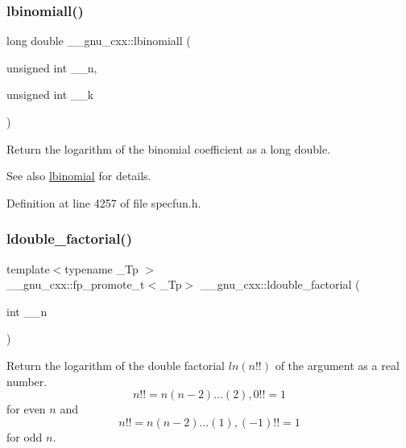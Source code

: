 \subsubsection{\texorpdfstring{lbinomiall()}{lbinomiall()}}
{\footnotesize\ttfamily long double \+\_\+\+\_\+gnu\+\_\+cxx\+::lbinomiall (\begin{DoxyParamCaption}\item[{unsigned int}]{\+\_\+\+\_\+n,  }\item[{unsigned int}]{\+\_\+\+\_\+k }\end{DoxyParamCaption})\hspace{0.3cm}{\ttfamily [inline]}}

Return the logarithm of the binomial coefficient as a {\ttfamily long double}.

\begin{DoxySeeAlso}{See also}
\hyperlink{group__gnu__math__spec__func_gabfa5aeba56edfa110846fc8e76963bc2}{lbinomial} for details. 
\end{DoxySeeAlso}


Definition at line 4257 of file specfun.\+h.

\mbox{\label{group__gnu__math__spec__func_ga43bf9a20282d5b9237bf352682a48395}} 
\subsubsection{\texorpdfstring{ldouble\+\_\+factorial()}{ldouble\_factorial()}}
{\footnotesize\ttfamily template$<$typename \+\_\+\+Tp $>$ \\
\+\_\+\+\_\+gnu\+\_\+cxx\+::fp\+\_\+promote\+\_\+t$<$\+\_\+\+Tp$>$ \+\_\+\+\_\+gnu\+\_\+cxx\+::ldouble\+\_\+factorial (\begin{DoxyParamCaption}\item[{int}]{\+\_\+\+\_\+n }\end{DoxyParamCaption})\hspace{0.3cm}{\ttfamily [inline]}}



Return the logarithm of the double factorial $ ln(n!!) $ of the argument as a real number. \[ n!! = n(n-2)...(2), 0!! = 1 \] for even $ n $ and \[ n!! = n(n-2)...(1), (-1)!! = 1 \] for odd $ n $. 



